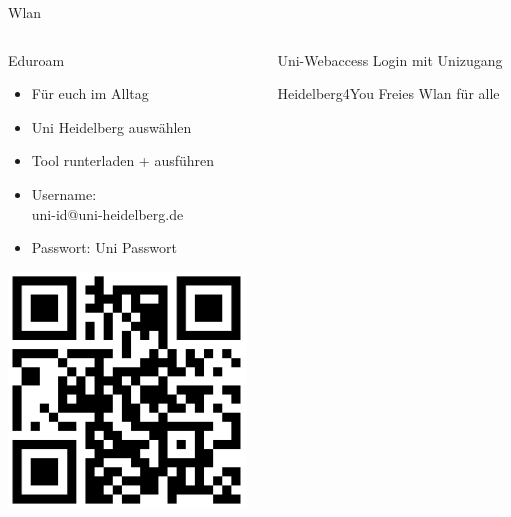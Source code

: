 \documentclass[t,aspectratio=1610, 12pt]{beamer} %
\begin{document}
\begin{frame}{Wlan}
	\begin{columns}
		\begin{column}{.7\textwidth}
			\begin{block}{Eduroam}
				\begin{minipage}{.5\linewidth}
					\vspace*{0.5cm}
					\begin{itemize}
						\item Für euch im Alltag
						\item Uni Heidelberg auswählen
						\item Tool runterladen + ausführen
						\item Username: \\ uni-id@uni-heidelberg.de
						\item Passwort: Uni Passwort
					\end{itemize}
					\vspace*{0.5cm}
				\end{minipage}
				\begin{minipage}{.4\linewidth}
					\centering\includegraphics[width=\linewidth]{eduroam}
					\vfill
				\end{minipage}				
			\end{block}
		\end{column}
		\begin{column}{.3\textwidth}
			\begin{block}{Uni-Webaccess}
				Login mit Unizugang
			\end{block}
			\begin{block}{Heidelberg4You}
				Freies Wlan für alle
			\end{block}
		\end{column}
	\end{columns}
\end{frame}
\end{document}
